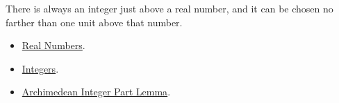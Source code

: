 \begin{remark*}[Interpretation]
There is always an integer just above a real number, and it can be chosen no
farther than one unit above that number.
\end{remark*}

\begin{dependencies}
\begin{itemize}
\item \hyperref[def:reals]{Real Numbers}.
\item \hyperref[def:integers]{Integers}.
\item \hyperref[lem:archimedean-integer-part-lemma]{Archimedean Integer Part Lemma}.
\end{itemize}
\end{dependencies}




